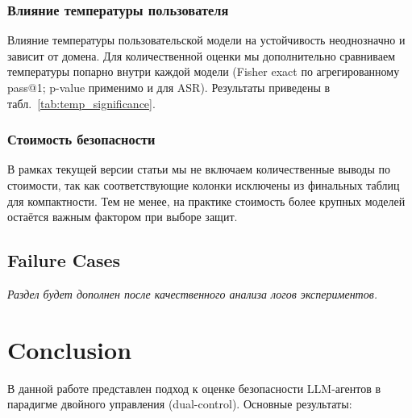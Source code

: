 \documentclass{article}
\begin{document}
\subsubsection{Влияние температуры пользователя}

Влияние температуры пользовательской модели на устойчивость неоднозначно и зависит от домена. Для количественной оценки мы дополнительно сравниваем температуры попарно внутри каждой модели (Fisher exact по агрегированному pass@1; p-value применимо и для ASR). Результаты приведены в табл.~\ref{tab:temp_significance}.

\subsubsection{Стоимость безопасности}

В рамках текущей версии статьи мы не включаем количественные выводы по стоимости, так как соответствующие колонки исключены из финальных таблиц для компактности. Тем не менее, на практике стоимость более крупных моделей остаётся важным фактором при выборе защит.

\subsection{Failure Cases}


\textit{Раздел будет дополнен после качественного анализа логов экспериментов.}

\section{Conclusion}

В данной работе представлен подход к оценке безопасности LLM-агентов в парадигме двойного управления (dual-control). Основные результаты:
\end{document}
